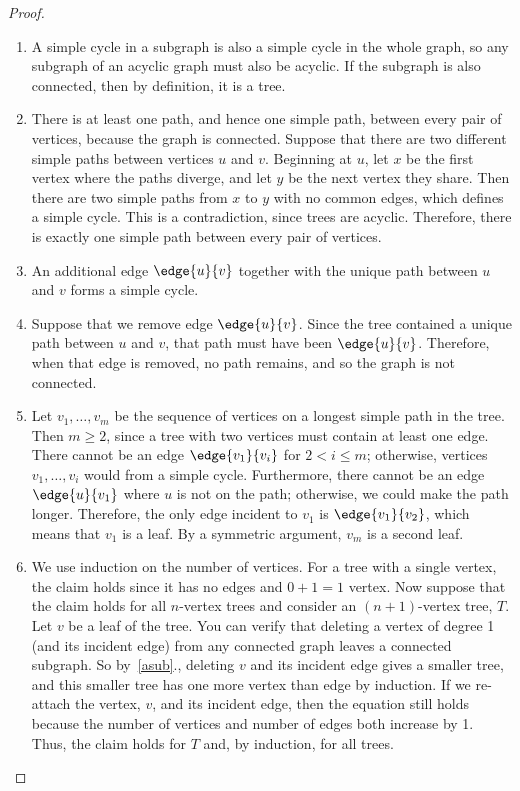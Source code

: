 \begin{proof}
\begin{enumerate}

\item A simple cycle in a subgraph is also a simple cycle in
the whole graph, so any subgraph of an acyclic graph must also be acyclic.
If the subgraph is also connected, then by definition, it is a tree.

\item There is at least one path, and hence one simple path, between every
pair of vertices, because the graph is connected.  Suppose that there are
two different simple paths between vertices $u$ and $v$.  Beginning at
$u$, let $x$ be the first vertex where the paths diverge, and let $y$ be
the next vertex they share.  Then there are two simple paths from $x$ to
$y$ with no common edges, which defines a simple cycle.  This is a
contradiction, since trees are acyclic.  Therefore, there is exactly one
simple path between every pair of vertices.


\item An additional edge $\edge{u}{v}$ together with the unique path
between $u$ and $v$ forms a simple cycle.

\item Suppose that we remove edge $\edge{u}{v}$.  Since the tree
contained a unique path between $u$ and $v$, that path must have been
$\edge{u}{v}$.  Therefore, when that edge is removed, no path remains,
and so the graph is not connected.

\item Let $v_1, \dots, v_m$ be the sequence of vertices on a longest
simple path in the tree.  Then $m \geq 2$, since a tree with two vertices
must contain at least one edge.  There cannot be an edge $\edge{v_1}{v_i}$
for $2 < i \leq m$; otherwise, vertices $v_1, \dots, v_i$ would from a
simple cycle.  Furthermore, there cannot be an edge $\edge{u}{v_1}$ where
$u$ is not on the path; otherwise, we could make the path longer.
Therefore, the only edge incident to $v_1$ is $\edge{v_1}{v_2}$, which
means that $v_1$ is a leaf.  By a symmetric argument, $v_m$ is a second
leaf.

\item We use induction on the number of vertices.  For a tree with a
single vertex, the claim holds since it has no edges and $0 + 1 = 1$ vertex.
Now suppose that the claim holds for all $n$-vertex trees and consider an
$(n+1)$-vertex tree, $T$.  Let $v$ be a leaf of the tree.
You can verify that deleting a vertex of degree 1 (and its incident edge)
from any connected graph leaves a connected subgraph.  So by~\ref{asub}.,
deleting $v$ and its incident edge gives a smaller tree, and this smaller
tree has one more vertex than edge by induction.  If we re-attach the
vertex, $v$, and its incident edge, then the equation still holds because
the number of vertices and number of edges both increase by 1.  Thus, the
claim holds for $T$ and, by induction, for all trees.
\end{enumerate}
\end{proof}
